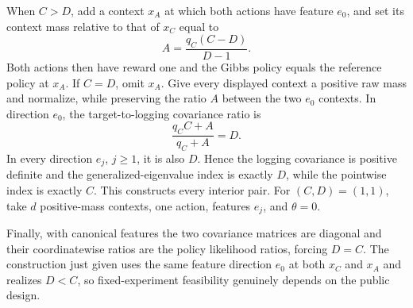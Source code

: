 When \(C>D\), add a context \(x_A\) at which both actions have feature \(e_0\), and set its context mass relative to that of \(x_C\) equal to
\[
A=\frac{q_C(C-D)}{D-1}.
\]
Both actions then have reward one and the Gibbs policy equals the reference policy at \(x_A\). If \(C=D\), omit \(x_A\). Give every displayed context a positive raw mass and normalize, while preserving the ratio \(A\) between the two \(e_0\) contexts. In direction \(e_0\), the target-to-logging covariance ratio is
\[
\frac{q_CC+A}{q_C+A}=D.
\]
In every direction \(e_j\), \(j\ge1\), it is also \(D\). Hence the logging covariance is positive definite and the generalized-eigenvalue index is exactly \(D\), while the pointwise index is exactly \(C\). This constructs every interior pair. For \((C,D)=(1,1)\), take \(d\) positive-mass contexts, one action, features \(e_j\), and \(\theta=0\).

Finally, with canonical features the two covariance matrices are diagonal and their coordinatewise ratios are the policy likelihood ratios, forcing \(D=C\). The construction just given uses the same feature direction \(e_0\) at both \(x_C\) and \(x_A\) and realizes \(D<C\), so fixed-experiment feasibility genuinely depends on the public design.